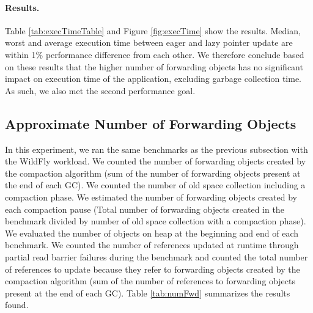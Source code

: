 \documentclass[sigplan,10pt,review,anonymous]{acmart}\settopmatter{printfolios=true,printccs=false,printacmref=false}
\begin{document}
\paragraph{Results.}
Table \ref{tab:execTimeTable} and Figure \ref{fig:execTime} show the results. Median, worst and average execution time between eager and lazy pointer update are within 1\% performance difference from each other. We therefore conclude based on these results that the higher number of forwarding objects has no significant impact on execution time of the application, excluding garbage collection time. As such, we also met the second performance goal.

\subsection{Approximate Number of Forwarding Objects}

In this experiment, we ran the same benchmarks as the previous subsection with the WildFly workload. We counted the number of forwarding objects created by the compaction algorithm (sum of the number of forwarding objects present at the end of each GC). We counted the number of old space collection including a compaction phase. We estimated the number of forwarding objects created by each compaction pause (Total number of forwarding objects created in the benchmark divided by number of old space collection with a compaction phase). We evaluated the number of objects on heap at the beginning and end of each benchmark. We counted the number of references updated at runtime through partial read barrier failures during the benchmark and counted the total number of references to update because they refer to forwarding objects created by the compaction algorithm (sum of the number of references to forwarding objects present at the end of each GC). Table \ref{tab:numFwd} summarizes the results found. 
\end{document}
